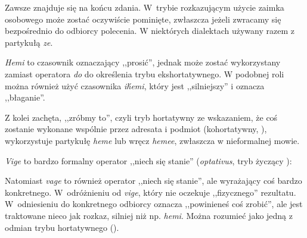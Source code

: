 Zawsze znajduje się na końcu zdania. W~trybie rozkazującym użycie zaimka
osobowego może zostać oczywiście pominięte, zwłaszcza jeżeli zwracamy się
bezpośrednio do odbiorcy polecenia. W niektórych dialektach używany razem z
partykułą \emph{ze}.



\emph{Hemi} to czasownik oznaczający ,,prosić'', jednak może zostać wykorzystany
zamiast operatora \emph{do} do określenia trybu ekshortatywnego. W podobnej roli
można również użyć czasownika \emph{ih́emi}, który jest ,,silniejszy'' i oznacza
,,błaganie''.




Z kolei zachęta, ,,zróbmy to'', czyli tryb hortatywny ze wskazaniem, że coś
zostanie wykonane wspólnie przez adresata i podmiot (kohortatywny, \Chr{}),
wykorzystuje partykułę \emph{heme} lub wręcz \emph{hemee}, zwłaszcza w
nieformalnej mowie.




\emph{Vige} to bardzo formalny operator ,,niech się stanie'' (\emph{optativus},
tryb życzący \Opt{}):


Natomiast \emph{vage} to również operator ,,niech się stanie'', ale wyrażający
coś bardzo konkretnego. W~odróżnieniu od \emph{vige}, który nie
oczekuje ,,fizycznego'' rezultatu. W~odniesieniu do konkretnego odbiorcy
oznacza ,,powinieneś coś zrobić'', ale jest traktowane nieco jak rozkaz,
silniej niż np. \emph{hemi}. Można rozumieć jako jedną z odmian trybu
hortatywnego (\Hort{}).

